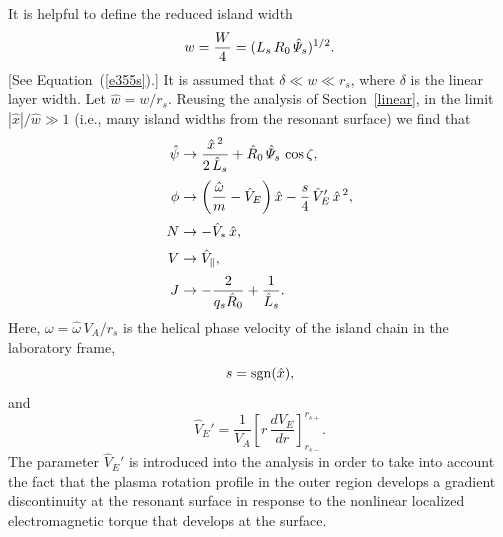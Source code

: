 \documentclass[notitlepage,12pt]{article}
\begin{document}
It is helpful to define the reduced island width
\begin{equation}\label{e456}
w = \frac{W}{4} = (L_s\,R_0\,\hat{\mit\Psi}_s)^{1/2}.
\end{equation}
[See Equation~(\ref{e355s}).]
It is assumed that $\delta\ll w\ll r_s$, where $\delta$ is the linear layer width. Let $\hat{w}= w/r_s$.  Reusing the analysis of Section~\ref{linear},
in the limit $|\hat{x}|/\hat{w}\gg 1$ (i.e., many island widths from the resonant surface) we find that 
\begin{align}
\hat{\psi} &\rightarrow \frac{\hat{x}^{\,2}}{2\,\hat{L}_s} + \hat{R}_0\,\hat{\mit\Psi}_s\,\cos\zeta,\\[0.5ex]
\phi &\rightarrow \left(\frac{\hat{\omega}}{m}- \hat{V}_E\right)\hat{x} - \frac{s}{4}\,\hat{V}_E'\,\hat{x}^{\,2},\\[0.5ex]
N &\rightarrow -\hat{V}_\ast\,\hat{x},\\[0.5ex]
V&\rightarrow \hat{V}_\parallel,\\[0.5ex]
J& \rightarrow -\frac{2}{q_s\hat{R}_0} + \frac{1}{\hat{L}_s}.
\end{align}
Here, $\omega = \hat{\omega}\,V_A/r_s$ is the helical phase velocity of the island chain in the
laboratory frame,
\begin{equation}
s = {\rm sgn}(\hat{x}),
\end{equation}
and 
\begin{equation}
\hat{V}_E' = \frac{1}{V_A}\left[r\,\frac{dV_E}{dr}\right]_{r_{s-}}^{r_{s+}}.
\end{equation}
The parameter $\hat{V}_E'$ is introduced  into the analysis in order to take into account the fact that the plasma rotation profile in the outer region develops a
gradient discontinuity at the resonant surface in response to the nonlinear localized electromagnetic torque that develops
at the surface. 
\end{document}
